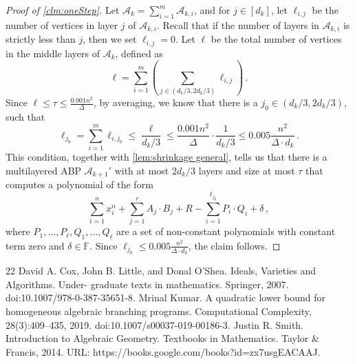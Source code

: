 \documentclass[10pt,a4paper]{article}
\newcommand{\F}{\mathbb F}
\newcommand{\inparen}[1]{\left(#1\right)}
\begin{document}
\begin{proof}[Proof of \autoref{clm:oneStep}]
	Let $\mathcal{A}_k = \sum_{i=1}^{m} \mathcal{A}_{k,i}$, and for $j \in [d_k]$, let $\ell_{i,j}$ be the number of vertices in layer $j$ of $\mathcal{A}_{k,i}$. Recall that if the number of layers in $\mathcal{A}_{k,i}$ is strictly less than $j$, then we set $\ell_{i,j} = 0$. Let $\ell$ be the total number of vertices in the middle layers of $\mathcal{A}_k$, defined as 
	\[ \ell = \sum_{i=1}^{m} \inparen{\sum_{j \in (d_k/3, 2d_k/3)} \ell_{i,j}} \, .\] 
	Since $\ell \leq \tau \leq \frac{0.001 n^2}{\Delta }$, by averaging, we know that there is a $j_0 \in (d_k/3, 2d_k/3)$, such that 
	\[
		\ell_{j_0} = \sum_{i=1}^{m}\ell_{i,{j_0}} \leq \frac{\ell}{d_k/3} \leq \frac{0.001 n^2}{\Delta } \cdot \frac{1}{d_k/3} \leq 0.005\frac{n^2}{\Delta \cdot d_k} \, .
	\]
	This condition, together with \autoref{lem:shrinkage general}, tells us that there is a multilayered ABP  $\mathcal{A}_{k+1}'$ with at most $2d_k/3$ layers and size at most $\tau$ that computes a polynomial of the form
	\[
		\sum_{i = 1}^n x_i^n + \sum_{j = 1}^r A_j\cdot B_j + R - \sum_{i=1}^{\ell_{j_0}} P_i \cdot Q_i + \delta \, , 
	\]
	where  $P_1, \ldots, P_{\ell}, Q_1, \ldots, Q_{\ell}$ are a set of non-constant polynomials with constant term zero and $\delta \in \F$. Since $\ell_{j_0} \leq 0.005\frac{n^2}{\Delta \cdot d_k}$, the claim follows.	
\end{proof}



\begin{thebibliography}{22}
 David A. Cox, John B. Little, and Donal O’Shea. Ideals, Varieties and Algorithms. Under- graduate texts in mathematics. Springer, 2007. doi:10.1007/978-0-387-35651-8.
 Mrinal Kumar. A quadratic lower bound for homogeneous algebraic branching programs. Computational Complexity, 28(3):409–435, 2019. doi:10.1007/s00037-019-00186-3.
 Justin R. Smith. Introduction to Algebraic Geometry. Textbooks in Mathematics. Taylor \& Francis, 2014. URL: https://books.google.com/books?id=zx7usgEACAAJ.
\end{thebibliography}
\end{document}
